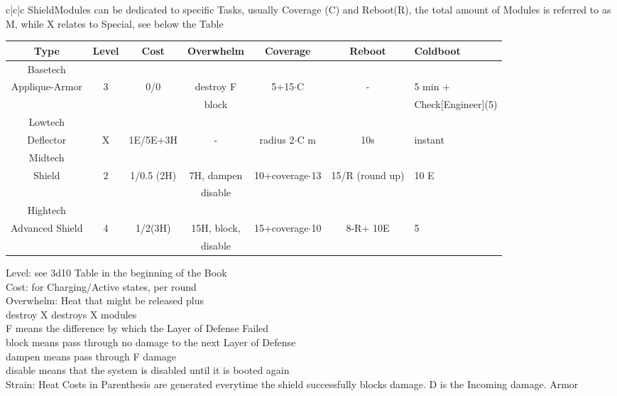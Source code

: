 \documentclass{article}
\newcommand\tab[1][1cm]{\hspace*{#1}}
\begin{document}
\begin{tabular}{c|c|c}
    ShieldModules can be dedicated to specific Tasks, usually
    Coverage (C) and Reboot(R), the total amount of Modules is referred to as M, while
    X relates to Special, see below the Table\newline
    \begin{tabular}{c|cccccl}
        Type & Level & Cost & Overwhelm & Coverage & Reboot & Coldboot \\
        \hline Basetech\\
        Applique-Armor & 3 & 0/0 & destroy F& 5+15\(\cdot\)C & -  & 5 min + \\
        &&&block&&& Check[Engineer](5) \\
        \hline Lowtech\\
        Deflector & X & 1E/5E+3H & - & radius 2\(\cdot\)C m & 10s & instant \\
        \hline Midtech\\
        Shield & 2 & 1/0.5 (2H) & 7H, dampen & 10+coverage\(\cdot\)13 & 15/R (round up) & 10 E \\
        & & & disable\\
        \hline Hightech\\
        Advanced Shield & 4 & 1/2(3H) & 15H, block,& 15+coverage\(\cdot\)10 & 8-R+ 10E & 5 \\
        &&& disable\\
    \end{tabular}\newline\newline\newline
    Level: see 3d10 Table in the beginning of the Book\\
    Cost: for Charging/Active states, per round\\
    Overwhelm: Heat that might be released plus \\
    \tab destroy X destroys X modules\\
    \tab F means the difference by which the Layer of Defense Failed\\
    \tab block means pass through no damage to the next Layer of Defense\\
    \tab dampen means pass through F damage\\
    \tab disable means that the system is disabled until it is booted again\\
    \newline
    Strain: Heat Costs in Parenthesis are generated everytime the shield successfully blocks damage. D is the Incoming damage.
    \pagebreak[2]
    Armor\newline

\end{tabular}
\end{document}
